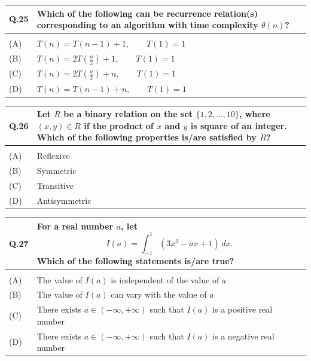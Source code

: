 \documentclass[14pt]{article}
\begin{document}
\vspace{0.3cm}

\begin{tabular}{|p{1.5cm}|p{12cm}|}
\hline
Q.25 &
Which of the following can be recurrence relation(s) corresponding to an algorithm with time complexity $\theta(n)$?
\\
\hline
& \\
\hline
(A) & $T(n)=T(n-1)+1,\qquad T(1)=1$ \\
\hline
(B) & $T(n)=2T\!\left(\frac{n}{2}\right)+1,\qquad T(1)=1$ \\
\hline
(C) & $T(n)=2T\!\left(\frac{n}{2}\right)+n,\qquad T(1)=1$ \\
\hline
(D) & $T(n)=T(n-1)+n,\qquad T(1)=1$ \\
\hline
\end{tabular}

\vspace{0.3cm}

\begin{tabular}{|p{1.5cm}|p{12cm}|}
\hline
Q.26 &
\parbox[t]{\linewidth}{
Let $R$ be a binary relation on the set $\{1,2,\ldots,10\}$, where $(x,y)\in R$ if the product of $x$ and $y$ is square of an integer. Which of the following properties is/are satisfied by $R$?
}
\\
\hline
& \\
\hline
(A) & Reflexive \\
\hline
(B) & Symmetric \\
\hline
(C) & Transitive \\
\hline
(D) & Antisymmetric \\
\hline
\end{tabular}

\newpage

\begin{tabular}{|p{1.5cm}|p{12cm}|}
\hline
Q.27 &
For a real number $a$, let
\[
I(a)=\int_{-1}^{1}(3x^2-ax+1)\,dx .
\]
Which of the following statements is/are true?
\\
\hline
& \\
\hline
(A) & The value of $I(a)$ is independent of the value of $a$ \\
\hline
(B) & The value of $I(a)$ can vary with the value of $a$ \\
\hline
(C) & There exists $a\in(-\infty,+\infty)$ such that $I(a)$ is a positive real number \\
\hline
(D) & There exists $a\in(-\infty,+\infty)$ such that $I(a)$ is a negative real number \\
\hline
\end{tabular}
\end{document}
